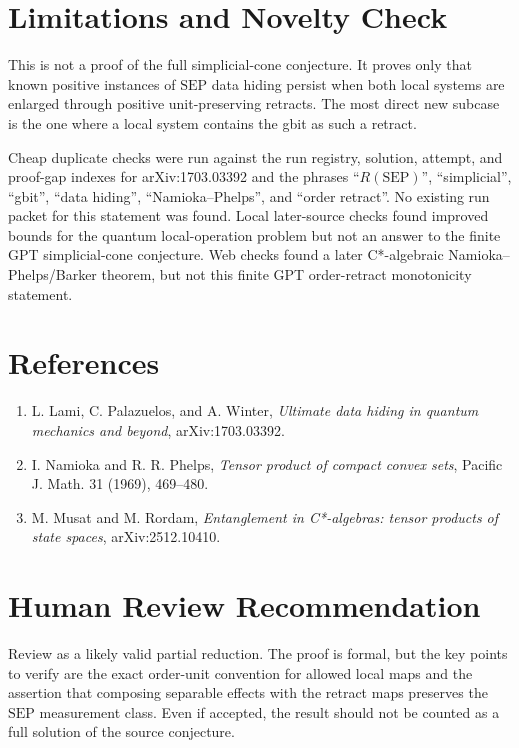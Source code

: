 \documentclass[11pt]{article}
\newcommand{\SEP}{\mathrm{SEP}}
\begin{document}
\section*{Limitations and Novelty Check}

This is not a proof of the full simplicial-cone conjecture.  It proves only
that known positive instances of \(\SEP\) data hiding persist when both local
systems are enlarged through positive unit-preserving retracts.  The most
direct new subcase is the one where a local system contains the gbit as such a
retract.

Cheap duplicate checks were run against the run registry, solution, attempt,
and proof-gap indexes for arXiv:1703.03392 and the phrases
``\(R(\SEP)\)'', ``simplicial'', ``gbit'', ``data hiding'',
``Namioka--Phelps'', and ``order retract''.  No existing run packet for this
statement was found.  Local later-source checks found improved bounds for
the quantum local-operation problem but not an answer to the finite GPT
simplicial-cone conjecture.  Web checks found a later C*-algebraic
Namioka--Phelps/Barker theorem, but not this finite GPT order-retract
monotonicity statement.

\section*{References}

\begin{enumerate}
\item L. Lami, C. Palazuelos, and A. Winter, \emph{Ultimate data hiding in
quantum mechanics and beyond}, arXiv:1703.03392.
\item I. Namioka and R. R. Phelps, \emph{Tensor product of compact convex
sets}, Pacific J. Math. 31 (1969), 469--480.
\item M. Musat and M. Rordam, \emph{Entanglement in C*-algebras: tensor
products of state spaces}, arXiv:2512.10410.
\end{enumerate}

\section*{Human Review Recommendation}

Review as a likely valid partial reduction.  The proof is formal, but the key
points to verify are the exact order-unit convention for allowed local maps
and the assertion that composing separable effects with the retract maps
preserves the \(\SEP\) measurement class.  Even if accepted, the result should
not be counted as a full solution of the source conjecture.
\end{document}

